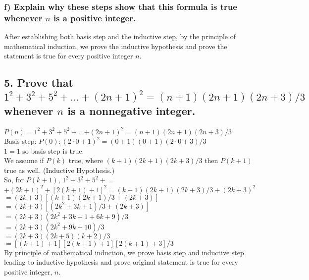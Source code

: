 \documentclass[11pt, oneside]{article} %
\numberwithin{equation}{section} %
\numberwithin{figure}{section} %
\numberwithin{table}{section} %
\begin{document}
\subsubsection{f) Explain why these steps show that this formula is true whenever $n$ is a positive integer.}
After establishing both basis step and the inductive step, by the principle of mathematical induction, we prove the inductive hypothesis and prove the statement is true for every positive integer $n$.

\subsection{5. Prove that $1^2 +3^2 +5^2 +...+(2n+1)^2 =(n+1) (2n + 1)(2n + 3)/3$ whenever $n$ is a nonnegative integer.}
$P(n) = 1^2 + 3^2 + 5^2 + $...$+ (2n+1)^2 = (n+1)(2n+1)(2n+3)/3 $ \\
Basis step: $P(0): (2\cdot0+1)^2 = (0+1)(0+1)(2\cdot0+3)/3$ \\
$1 = 1$ so basis step is true.  \\
We assume if $P(k)$ true, where $(k+1)(2k+1)(2k+3)/3$ then $P(k+1)$ true as well. (Inductive Hypothesis.)\\
So, for $P(k+1)$, $1^2 + 3^2 + 5^2 +$ .. $+ (2k+1)^2 + [2(k+1)+1]^2 = (k+1)(2k+1)(2k+3)/3 + (2k+3)^2$\\
$= (2k+3)[(k+1)(2k+1)/3 + (2k+3)]$ \\
$= (2k+3)[(2k^2 + 3k + 1)/3 +(2k+3)]$ \\
$= (2k+3)(2k^2 + 3k + 1 + 6k + 9)/3$ \\
$= (2k+3)(2k^2 + 9k + 10)/3$ \\
$= (2k+3)(2k + 5)(k + 2)/3$ \\
$= [(k+1)+1][2(k+1) +1][2(k+1) +3]/3$\\
By principle of mathematical induction, we prove basis step and inductive step leading to inductive hypothesis and prove original statement is true for every positive integer, $n$.

\end{document}
